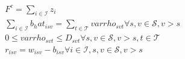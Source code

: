 \begin{align}
  & F^{c} = \sum_{i \in \mathcal{I}} z_{i} \tag{eq\_0043\_c} \\
  & \sum_{i \in \mathcal{I}} b_hat_{i s v} = \sum_{t \in \mathcal{T}} \mathit{varrho}_{s v t} \forall s , v \in \mathcal{S} , v > s \tag{eq\_0043\_e} \\
  & 0 \leq \mathit{varrho}_{s v t} \leq D_{s v t} \forall s , v \in \mathcal{S} , v > s , t \in \mathcal{T} \tag{eq\_0043\_f} \\
  & r_{i s v} = w_{i s v} - b_{i s v} \forall i \in \mathcal{I} , s , v \in \mathcal{S} , v > s \tag{eq\_0043\_i} \\
\end{align}
